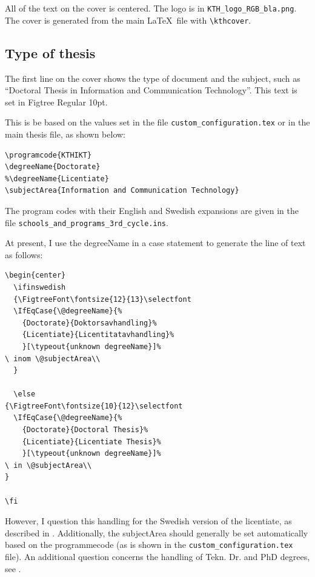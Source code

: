 \documentclass[12pt, twoside]{article}
\newif\ifinswedish
\begin{document}
All of the text on the cover is centered. The logo is in \texttt{KTH\_logo\_RGB\_bla.png}. The cover is generated from the main \LaTeX\ file with \texttt{\textbackslash kthcover}.

\subsection{Type of thesis}
\label{sec:cycleTypeofThesis}
The first line on the cover shows the type of document and the subject, such as ``Doctoral Thesis in Information and Communication Technology''. This text is set in Figtree Regular 10pt.

This is be based on the values set in the file \texttt{custom\_configuration.tex} or in the main thesis file, as shown below:

\begin{lstlisting}[style=latexExampleForAuthors]
\programcode{KTHIKT}
\degreeName{Doctorate}
%\degreeName{Licentiate}
\subjectArea{Information and Communication Technology}
\end{lstlisting}

The program codes with their English and Swedish expansions are given in the file \texttt{schools\_and\_programs\_3rd\_cycle.ins}.

At present, I use the degreeName in a case statement to generate the line of text as follows:
\begin{lstlisting}[style=latexExampleForAuthors]
\begin{center}
  \ifinswedish
  {\FigtreeFont\fontsize{12}{13}\selectfont 
  \IfEqCase{\@degreeName}{%
    {Doctorate}{Doktorsavhandling}%
    {Licentiate}{Licentitatavhandling}%
    }[\typeout{unknown degreeName}]%
\ inom \@subjectArea\\
  }

  \else
{\FigtreeFont\fontsize{10}{12}\selectfont
  \IfEqCase{\@degreeName}{%
    {Doctorate}{Doctoral Thesis}%
    {Licentiate}{Licentiate Thesis}%
    }[\typeout{unknown degreeName}]%
\ in \@subjectArea\\
}

\fi
\end{lstlisting}

However, I question this handling for the Swedish version of the licentiate, as described in  .
Additionally, the subjectArea should generally be set automatically based on the programmecode (as is shown in the \texttt{custom\_configuration.tex} file).
An additional question concerns the handling of Tekn. Dr. and PhD degrees, see .
\end{document}
